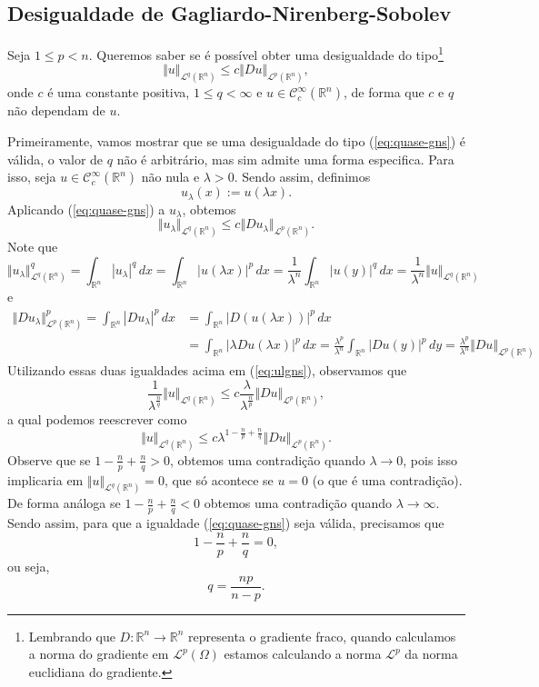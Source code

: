\documentclass[a4paper, 11pt]{book}
\theoremstyle{definition}
\newcommand{\bR}{\mathbb{R}}
\newcommand{\cC}{\mathcal{C}}
\newcommand{\cL}{\mathcal{L}}
\begin{document}
\subsection{Desigualdade de Gagliardo-Nirenberg-Sobolev}

Seja $1 \leqslant p < n$.
Queremos saber se é possível obter uma desigualdade do tipo\footnote{
    Lembrando que $D : \bR^n \to \bR^n$ representa o gradiente fraco, quando calculamos a norma do gradiente em $\cL^p(\Omega)$ estamos calculando a norma $\cL^p$ da norma euclidiana do gradiente.
}
\begin{equation} \label{eq:quase-gns}
    \Vert u \Vert_{\cL^q(\bR^n)} \leqslant c \Vert Du \Vert_{\cL^p(\bR^n)},
\end{equation}
onde $c$ é uma constante positiva, $1 \leqslant q < \infty$ e $u \in \cC^\infty_c(\bR^n)$, de forma que $c$ e $q$ não dependam de $u$.

Primeiramente, vamos mostrar que se uma desigualdade do tipo (\ref{eq:quase-gns}) é válida, o valor de $q$ não é arbitrário, mas sim admite uma forma especifica.
Para isso, seja $u \in \cC^\infty_c(\bR^n)$ não nula e $\lambda > 0$.
Sendo assim, definimos
\[
    u_\lambda(x) := u(\lambda x).
\]
Aplicando (\ref{eq:quase-gns}) a $u_\lambda$, obtemos
\begin{equation} \label{eq:ulgns}
    \Vert u_\lambda \Vert_{\cL^q(\bR^n)} \leqslant c \Vert Du_\lambda \Vert_{\cL^p(\bR^n)}.
\end{equation}
Note que
\[
    \Vert u_\lambda \Vert_{\cL^q(\bR^n)}^q = \int_{\bR^n} |u_\lambda|^q \,dx = \int_{\bR^n} |u(\lambda x)|^p \,dx = \frac{1}{\lambda^n} \int_{\bR^n} |u(y)|^q \,dx = \frac{1}{\lambda^n}\Vert u \Vert_{\cL^q(\bR^n)}
\]
e
\[
    \begin{aligned}
        \Vert Du_\lambda \Vert_{\cL^p(\bR^n)}^p = \int_{\bR^n} |Du_\lambda|^p \,dx &= \int_{\bR^n} |D(u(\lambda x))|^p \,dx \\
        &= \int_{\bR^n} |\lambda Du(\lambda x)|^p \,dx = \frac{\lambda^p}{\lambda^n} \int_{\bR^n} |Du(y)|^p \,dy = \frac{\lambda^p}{\lambda^n}\Vert Du \Vert_{\cL^p(\bR^n)}
    \end{aligned}
\]
Utilizando essas duas igualdades acima em (\ref{eq:ulgns}), observamos que
\[
    \frac{1}{\lambda^{\frac{n}{q}}} \Vert u \Vert_{\cL^q(\bR^n)} \leqslant c \frac{\lambda}{\lambda^{\frac{n}{p}}}\Vert Du \Vert_{\cL^p(\bR^n)},
\]
a qual podemos reescrever como
\begin{equation}
    \Vert u \Vert_{\cL^q(\bR^n)} \leqslant c\lambda^{1 - \frac{n}{p}  + \frac{n}{q}}\Vert Du \Vert_{\cL^p(\bR^n)}.
\end{equation}
Observe que se $1 - \frac{n}{p} + \frac{n}{q} > 0$, obtemos uma contradição quando $\lambda \to 0$, pois isso implicaria em $\Vert u \Vert_{\cL^q(\bR^n)} = 0$,
que só acontece se $u = 0$ (o que é uma contradição).
De forma análoga se $1 - \frac{n}{p} + \frac{n}{q} < 0$ obtemos uma contradição quando $\lambda \to \infty$.
Sendo assim, para que a igualdade (\ref{eq:quase-gns}) seja válida, precisamos que
\[
    1 - \frac{n}{p} + \frac{n}{q} = 0,
\]
ou seja,
\[
    q = \frac{np}{n - p}.
\]
\end{document}
